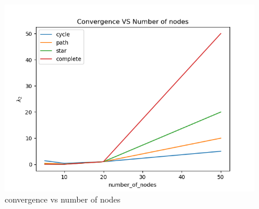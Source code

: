 \documentclass{article}
\begin{document}
\begin{problem}
\begin{figure}
        \includegraphics[width=\textwidth]{./img/p1convergence_num_node.png}
        \caption{convergence vs number of nodes}
    \end{figure}
\end{problem}
\end{document}
